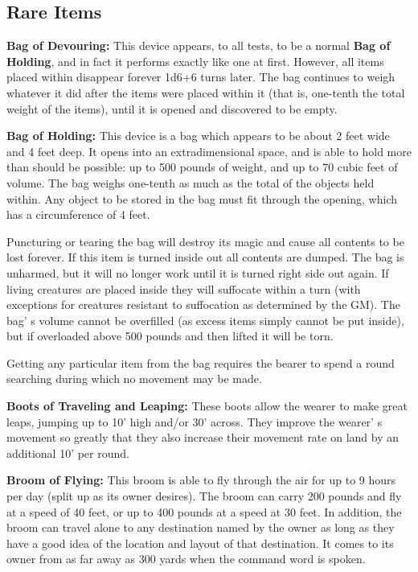 \documentclass[a4paper,twoside,openany,10pt]{book}
\begin{document}
\begin{multicols}{2}
\subsection{Rare Items}\label{rare-items-1}

\textbf{Bag of Devouring:} This device appears, to all tests, to be a normal \textbf{Bag of Holding}, and in fact it performs exactly like one at first. However, all items placed within disappear forever 1d6+6 turns later. The bag continues to weigh whatever it did after the items were placed within it (that is, one-tenth the total weight of the items), until it is opened and discovered to be empty.

\textbf{Bag of Holding:} This device is a bag which appears to be about 2 feet wide and 4 feet deep. It opens into an extradimensional space, and is able to hold more than should be possible: up to 500 pounds of weight, and up to 70 cubic feet of volume. The bag weighs one-tenth as much as the total of the objects held within. Any object to be stored in the bag must fit through the opening, which has a circumference of 4 feet.

Puncturing or tearing the bag will destroy its magic and cause all contents to be lost forever. If this item is turned inside out all contents are dumped. The bag is unharmed, but it will no longer work until it is turned right side out again. If living creatures are placed inside they will suffocate within a turn (with exceptions for creatures resistant to suffocation as determined by the GM). The bag' s volume cannot be overfilled (as excess items simply cannot be put inside), but if overloaded above 500 pounds and then lifted it will be torn.

Getting any particular item from the bag requires the bearer to spend a round searching during which no movement may be made.

\textbf{Boots of Traveling and Leaping:} These boots allow the wearer to make great leaps, jumping up to 10' high and/or 30' across. They improve the wearer' s movement so greatly that they also increase their movement rate on land by an additional 10' per round.

\textbf{Broom of Flying:} This broom is able to fly through the air for up to 9 hours per day (split up as its owner desires). The broom can carry 200 pounds and fly at a speed of 40 feet, or up to 400 pounds at a speed at 30 feet. In addition, the broom can travel alone to any destination named by the owner as long as they have a good idea of the location and layout of that destination. It comes to its owner from as far away as 300 yards when the command word is spoken.


\end{multicols}
\end{document}
